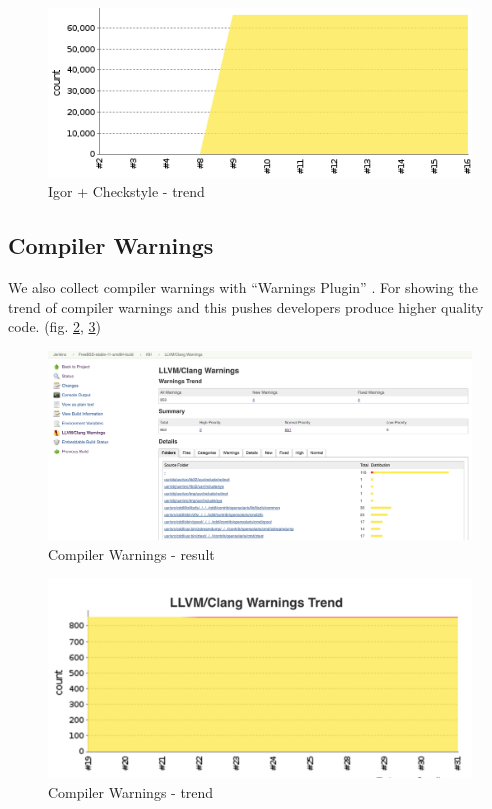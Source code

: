 \documentclass[a4paper,twocolumn,10pt]{article}
\begin{document}
\begin{figure}
\includegraphics{checkstyle-trend.png}
\caption{Igor + Checkstyle - trend}
\label{checkstyle-trend}
\end{figure}

\subsection{Compiler Warnings}

We also collect compiler warnings with ``Warnings Plugin''
\cite{jenkins-warnings-plugin}. For showing the trend of compiler
warnings and this pushes developers produce higher quality code. (fig.
\ref{compiler-result}, \ref{compiler-trend})

\begin{figure}
\includegraphics[width=\textwidth]{compiler-result.png}
\caption{Compiler Warnings - result}
\label{compiler-result}
\end{figure}

\begin{figure}
\includegraphics{compiler-trend.png}
\caption{Compiler Warnings - trend}
\label{compiler-trend}
\end{figure}
\end{document}
